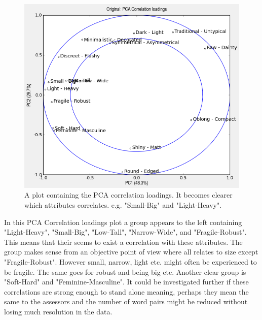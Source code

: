 \begin{figure}[H]
\centering
\includegraphics[width = \textwidth]{Figure/PCA_correlations.png}
\caption{A plot containing the PCA correlation loadings. It becomes clearer which attributes correlates. e.g. "Small-Big" and "Light-Heavy".}
\label{fig:pca}
\end{figure}

In this PCA Correlation loadings plot a group appears to the left containing "Light-Heavy", "Small-Big",  "Low-Tall", "Narrow-Wide", and "Fragile-Robust". This means that their seems to exist a correlation with these attributes. The group makes sense from an objective point of view where all relates to size except "Fragile-Robust". However small, narrow, light etc. might often be experienced to be fragile. The same goes for robust and being big etc. Another clear group is "Soft-Hard" and "Feminine-Masculine". It could be investigated further if these correlations are strong enough to stand alone meaning, perhaps they mean the same to the assessors and the number of word pairs might be reduced without losing much resolution in the data.